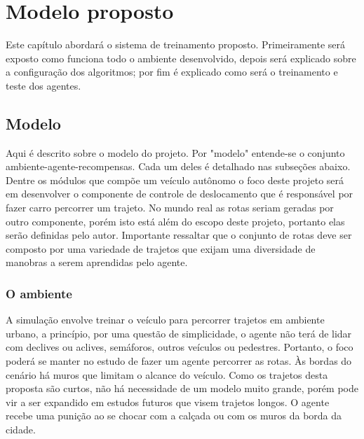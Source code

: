 \chapter{Modelo proposto}\label{cap:proposta}
Este capítulo abordará o sistema de treinamento proposto. Primeiramente será exposto como funciona todo o ambiente desenvolvido, depois será explicado sobre a configuração dos algoritmos; por fim é explicado como será o treinamento e teste dos agentes. 

\section{Modelo}\label{modelo}
Aqui é descrito sobre o modelo do projeto. Por "modelo"{} entende-se o conjunto ambiente-agente-recompensas. Cada um deles é detalhado nas subseções abaixo. Dentre os módulos que compõe um veículo autônomo o foco deste projeto será em desenvolver o componente de controle de deslocamento que é responsável por fazer carro percorrer um trajeto. No mundo real as rotas seriam geradas por outro componente, porém isto está além do escopo deste projeto, portanto elas serão definidas pelo autor. Importante ressaltar que o conjunto de rotas deve ser composto por uma variedade de trajetos que exijam uma diversidade de manobras a serem aprendidas pelo agente.

\subsection{O ambiente}
A simulação envolve treinar o veículo para percorrer trajetos em ambiente urbano, a princípio, por uma questão de simplicidade, o agente não terá de lidar com declives ou aclives, semáforos, outros veículos ou pedestres. Portanto, o foco poderá se manter no estudo de fazer um agente percorrer as rotas. Às bordas do cenário há muros que limitam o alcance do veículo. Como os trajetos desta proposta são curtos, não há necessidade de um modelo muito grande, porém pode vir a ser expandido em estudos futuros que visem trajetos longos. O agente recebe uma punição ao se chocar com a calçada ou com os muros da borda da cidade.

